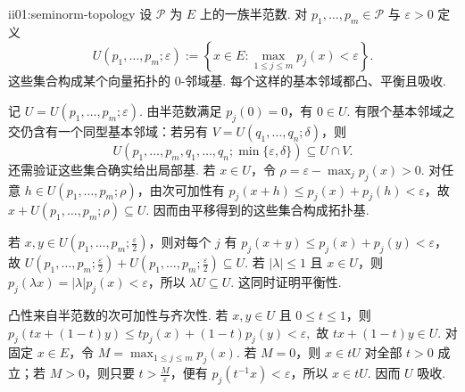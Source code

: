 \begin{FAProposition}[B][半范数族生成向量拓扑]{ii01:seminorm-topology}
设 \(\displaystyle \mathcal P\) 为 \(\displaystyle E\) 上的一族半范数. 对 \(\displaystyle p_1,\dots,p_m\in\mathcal P\) 与 \(\displaystyle \varepsilon>0\) 定义
\[
U(p_1,\dots,p_m;\varepsilon)
:=
\left\{x\in E:\max_{1\leqslant j\leqslant m}p_j(x)<\varepsilon\right\}.
\]
这些集合构成某个向量拓扑的 \(\displaystyle0\)-邻域基. 每个这样的基本邻域都凸、平衡且吸收.
\end{FAProposition}

\begin{FAProof}
记 \(\displaystyle U=U(p_1,\dots,p_m;\varepsilon)\). 由半范数满足 \(\displaystyle p_j(0)=0\)，有 \(\displaystyle0\in U\). 有限个基本邻域之交仍含有一个同型基本邻域：若另有 \(\displaystyle V=U(q_1,\dots,q_n;\delta)\)，则
\[
U(p_1,\dots,p_m,q_1,\dots,q_n;\min\{\varepsilon,\delta\}) \subseteq U\cap V.
\]
还需验证这些集合确实给出局部基. 若 \(\displaystyle x\in U\)，令 \(\displaystyle \rho=\varepsilon-\max_jp_j(x)>0\). 对任意 \(\displaystyle h\in U(p_1,\dots,p_m;\rho)\)，由次可加性有 \(\displaystyle p_j(x+h)\leqslant p_j(x)+p_j(h)<\varepsilon\)，故 \(\displaystyle x+U(p_1,\dots,p_m;\rho)\subseteq U\). 因而由平移得到的这些集合构成拓扑基.

若 \(\displaystyle x,y\in U(p_1,\dots,p_m;\frac{\varepsilon}{2})\)，则对每个 \(\displaystyle j\) 有 \(\displaystyle p_j(x+y)\leqslant p_j(x)+p_j(y)<\varepsilon\)，故
\(\displaystyle U(p_1,\dots,p_m;\frac{\varepsilon}{2}) + U(p_1,\dots,p_m;\frac{\varepsilon}{2}) \subseteq U.\)
若 \(\displaystyle |\lambda|\leqslant1\) 且 \(\displaystyle x\in U\)，则 \(\displaystyle p_j(\lambda x)=|\lambda|p_j(x)<\varepsilon\)，所以 \(\displaystyle \lambda U\subseteq U\). 这同时证明平衡性.

凸性来自半范数的次可加性与齐次性. 若 \(\displaystyle x,y\in U\) 且 \(\displaystyle0\leqslant t\leqslant1\)，则
\(\displaystyle p_j(tx+(1-t)y) \leqslant t p_j(x)+(1-t)p_j(y) <\varepsilon,\)
故 \(\displaystyle tx+(1-t)y\in U\). 对固定 \(\displaystyle x\in E\)，令 \(\displaystyle M=\max_{1\leqslant j\leqslant m}p_j(x)\). 若 \(\displaystyle M=0\)，则 \(\displaystyle x\in tU\) 对全部 \(\displaystyle t>0\) 成立；若 \(\displaystyle M>0\)，则只要 \(\displaystyle t>\frac{M}{\varepsilon}\)，便有 \(\displaystyle p_j(t^{-1}x)<\varepsilon\)，所以 \(\displaystyle x\in tU\). 因而 \(\displaystyle U\) 吸收.


\end{FAProof}
